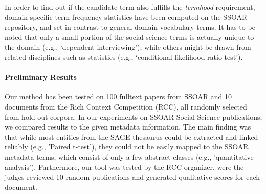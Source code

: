 In order to find out if the candidate term also fulfills the \textit{termhood} requirement, domain-specific term frequency statistics have been computed on the SSOAR repository, and set in contrast to general domain vocabulary terms. 
It has to be noted  that only a small portion of the social science terms is actually unique to the domain (e.g.,  `dependent interviewing'), while others might be drawn from related disciplines such as statistics (e.g., `conditional likelihood ratio test').


\paragraph{Preliminary Results}%
Our method has been tested on 100 fulltext papers from SSOAR and 10 documents from the Rich Context Competition (RCC), all randomly selected from hold out corpora.
In our experiments on SSOAR Social Science publications, we compared results to the given metadata information.
The main finding was that while most entities from the SAGE thesaurus could be extracted and linked reliably (e.g., 'Paired t-test'), they could not be easily mapped to the SSOAR metadata terms, which consist of only a few abstract classes (e.g., 'quantitative analysis'). Furthermore, our tool was tested by the RCC organizer, were the judges reviewed 10 random publications and generated qualitative scores for each document.  %

